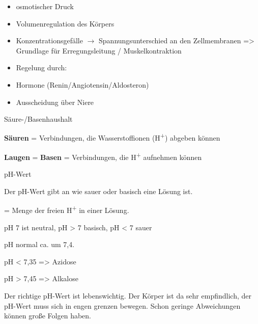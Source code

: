 \documentclass{article}
\newcommand\gT[1]{\textbf{\textup{\textcolor[rgb]{0.0,0.5019608,0.0}{#1}}}}
\newcommand\gZ[1]{\textcolor[rgb]{0.5019608,0.5019608,0.5019608}{#1}}
\begin{document}
\begin{itemize}
\item {\mdseries
osmotischer Druck}

\end{itemize}
\begin{itemize}
\item {\mdseries
Volumenregulation des K\"orpers}

\end{itemize}
\begin{itemize}
\item {\mdseries
Konzentrationsgef\"alle ${\rightarrow}$ Spannungsunterschied an den
Zellmembranen ={\textgreater} Grundlage f\"ur Erregungsleitung /
Muskelkontraktion}

\item {\mdseries
Regelung durch:}

\end{itemize}
\begin{itemize}
\item {\mdseries
Hormone \gZ{(Renin/Angiotensin/Aldosteron)}}

\item {\mdseries
Ausscheidung \"uber Niere}

\end{itemize}
{\mdseries\color[rgb]{0.0,0.0,0.5019608}
S\"aure-/Basenhaushalt }

{\mdseries
{}\gT{S\"auren} = Verbindungen, die 
Wasserstoffionen (H\textsuperscript{+}) abgeben k\"onnen}

{\mdseries
{}\gT{Laugen} =
\gT{Basen} = Verbindungen, die
H\textsuperscript{+}  aufnehmen k\"onnen}

{\mdseries\color{black}
pH-Wert}

{\mdseries
Der pH-Wert gibt an wie sauer oder basisch eine L\"osung ist.}

{\mdseries
= Menge der freien H\textsuperscript{+}  in einer L\"osung.}

{\mdseries
pH 7 ist neutral, pH {\textgreater} 7 basisch, pH {\textless} 7 sauer}

{\mdseries
\gZ{pH normal ca. um 7,4.}}

{\mdseries
\gZ{pH {\textless} 7,35  ={\textgreater} Azidose}}

{\mdseries
\gZ{pH {\textgreater} 7,45  ={\textgreater} Alkalose}}

{\mdseries
Der richtige pH-Wert ist lebenswichtig. Der K\"orper ist da sehr
empfindlich, der pH-Wert muss sich in engen grenzen bewegen. Schon
geringe Abweichungen k\"onnen gro{\ss}e Folgen haben. }
\end{document}
